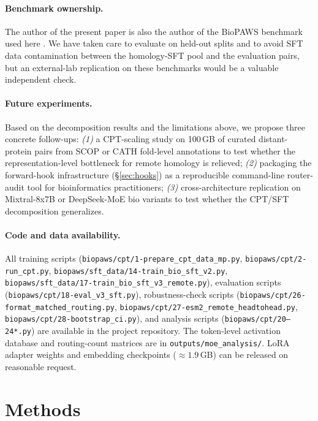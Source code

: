 \documentclass[11pt]{article}
\begin{document}
\paragraph{Benchmark ownership.} The author of the present paper is also the author of the BioPAWS benchmark used here \citep{wang2026biopaws}. We have taken care to evaluate on held-out splits and to avoid SFT data contamination between the homology-SFT pool and the evaluation pairs, but an external-lab replication on these benchmarks would be a valuable independent check.

\paragraph{Future experiments.}

Based on the decomposition results and the limitations above, we propose three concrete follow-ups: \emph{(1)} a CPT-scaling study on 100\,GB of curated distant-protein pairs from SCOP \citep{murzin1995scop} or CATH fold-level annotations to test whether the representation-level bottleneck for remote homology is relieved; \emph{(2)} packaging the forward-hook infrastructure (\S\ref{sec:hooks}) as a reproducible command-line router-audit tool for bioinformatics practitioners; \emph{(3)} cross-architecture replication on Mixtral-8x7B \citep{jiang2024mixtral} or DeepSeek-MoE \citep{dai2024deepseekmoe} bio variants to test whether the CPT/SFT decomposition generalizes.

\paragraph{Code and data availability.}

All training scripts (\texttt{biopaws/cpt/1-prepare\_cpt\_data\_mp.py}, \texttt{biopaws/cpt/2-run\_cpt.py}, \texttt{biopaws/sft\_data/14-train\_bio\_sft\_v2.py}, \texttt{biopaws/sft\_data/17-train\_bio\_sft\_v3\_remote.py}), evaluation scripts (\texttt{biopaws/cpt/18-eval\_v3\_sft.py}), robustness-check scripts (\texttt{biopaws/cpt/26-format\_matched\_routing.py}, \texttt{biopaws/cpt/27-esm2\_remote\_headtohead.py}, \texttt{biopaws/cpt/28-bootstrap\_ci.py}), and analysis scripts (\texttt{biopaws/cpt/20--24*.py}) are available in the project repository. The token-level activation database and routing-count matrices are in \texttt{outputs/moe\_analysis/}. LoRA adapter weights and embedding checkpoints ($\approx 1.9$\,GB) can be released on reasonable request.

\section{Methods}
\label{sec:methods}
\end{document}
